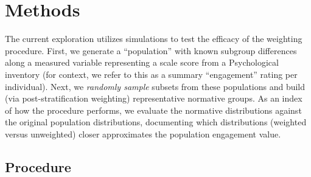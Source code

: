 \documentclass[
  ,man]{apa7}
\begin{document}
\hypertarget{methods}{%
\section{Methods}\label{methods}}

The current exploration utilizes simulations to test the efficacy of the weighting procedure. First, we generate a ``population'' with known subgroup differences along a measured variable representing a scale score from a Psychological inventory (for context, we refer to this as a summary ``engagement'' rating per individual). Next, we \emph{randomly sample} subsets from these populations and build (via post-stratification weighting) representative normative groups. As an index of how the procedure performs, we evaluate the normative distributions against the original population distributions, documenting which distributions (weighted versus unweighted) closer approximates the population engagement value.

\hypertarget{procedure}{%
\subsection{Procedure}\label{procedure}}
\end{document}
